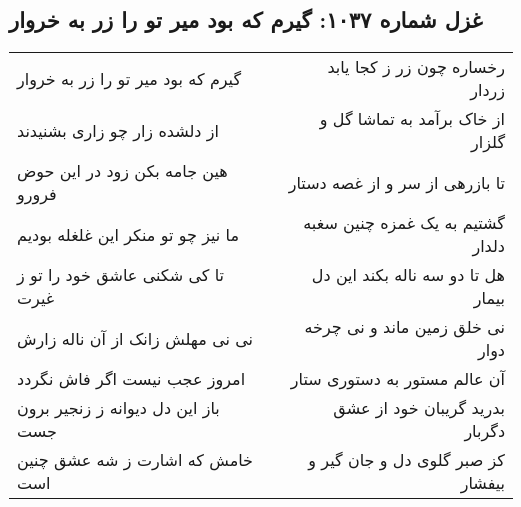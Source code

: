 \begin{center}
\section*{غزل شماره ۱۰۳۷: گیرم که بود میر تو را زر به خروار}
\label{sec:1037}
\begin{longtable}{l p{0.5cm} r}
گیرم که بود میر تو را زر به خروار
&&
رخساره چون زر ز کجا یابد زردار
\\
از دلشده زار چو زاری بشنیدند
&&
از خاک برآمد به تماشا گل و گلزار
\\
هین جامه بکن زود در این حوض فرورو
&&
تا بازرهی از سر و از غصه دستار
\\
ما نیز چو تو منکر این غلغله بودیم
&&
گشتیم به یک غمزه چنین سغبه دلدار
\\
تا کی شکنی عاشق خود را تو ز غیرت
&&
هل تا دو سه ناله بکند این دل بیمار
\\
نی نی مهلش زانک از آن ناله زارش
&&
نی خلق زمین ماند و نی چرخه دوار
\\
امروز عجب نیست اگر فاش نگردد
&&
آن عالم مستور به دستوری ستار
\\
باز این دل دیوانه ز زنجیر برون جست
&&
بدرید گریبان خود از عشق دگربار
\\
خامش که اشارت ز شه عشق چنین است
&&
کز صبر گلوی دل و جان گیر و بیفشار
\\
\end{longtable}
\end{center}
